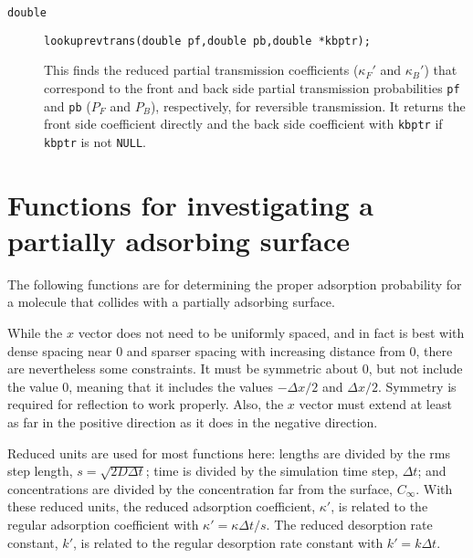 \documentclass[11pt]{article}
\newcommand {\ttt} {\texttt}
\begin{document}
\begin{description}
\item[\ttt{double}]
\ttt{lookuprevtrans(double pf,double pb,double *kbptr);}

This finds the reduced partial transmission coefficients ($\kappa_F'$ and $\kappa_B'$) that correspond to the front and back side partial transmission probabilities \ttt{pf} and \ttt{pb} ($P_F$ and $P_B$), respectively, for reversible transmission. It returns the front side coefficient directly and the back side coefficient with \ttt{kbptr} if \ttt{kbptr} is not \ttt{NULL}.

\end{description}

\section{Functions for investigating a partially adsorbing surface}

The following functions are for determining the proper adsorption probability for a molecule that collides with a partially adsorbing surface.

While the $x$ vector does not need to be uniformly spaced, and in fact is best with dense spacing near 0 and sparser spacing with increasing distance from 0, there are nevertheless some constraints. It must be symmetric about 0, but not include the value 0, meaning that it includes the values $-\Delta x/2$ and $\Delta x/2$. Symmetry is required for reflection to work properly. Also, the $x$ vector must extend at least as far in the positive direction as it does in the negative direction.

Reduced units are used for most functions here: lengths are divided by the rms step length, $s = \sqrt{2D \Delta t}$; time is divided by the simulation time step, $\Delta t$; and concentrations are divided by the concentration far from the surface, $C_\infty$. With these reduced units, the reduced adsorption coefficient, $\kappa'$, is related to the regular adsorption coefficient with $\kappa' = \kappa \Delta t/s$. The reduced desorption rate constant, $k'$, is related to the regular desorption rate constant with $k' = k \Delta t$.
\end{document}
